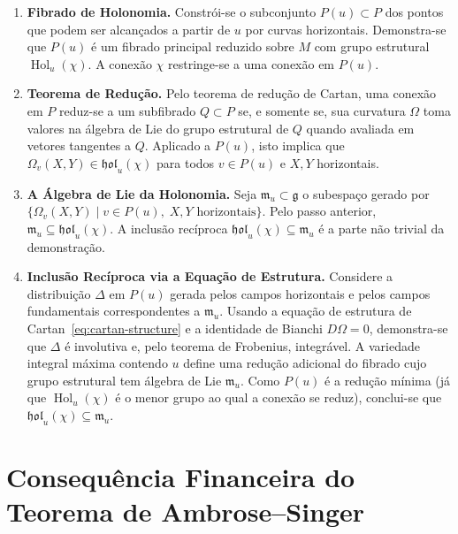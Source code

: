 \begin{enumerate}
 \item \textbf{Fibrado de Holonomia.} Constr\'oi-se o subconjunto \(P(u) \subset P\) dos pontos que podem ser alcan\c{c}ados a partir de \(u\) por curvas horizontais. Demonstra-se que \(P(u)\) \'e um fibrado principal reduzido sobre \(M\) com grupo estrutural \(\operatorname{Hol}_u(\chi)\). A conex\~ao \(\chi\) restringe-se a uma conex\~ao em \(P(u)\).

 \item \textbf{Teorema de Redu\c{c}\~ao.} Pelo teorema de redu\c{c}\~ao de Cartan, uma conex\~ao em \(P\) reduz-se a um subfibrado \(Q \subset P\) se, e somente se, sua curvatura \(\Omega\) toma valores na \'algebra de Lie do grupo estrutural de \(Q\) quando avaliada em vetores tangentes a \(Q\). Aplicado a \(P(u)\), isto implica que \(\Omega_v(X,Y) \in \mathfrak{hol}_u(\chi)\) para todos \(v \in P(u)\) e \(X,Y\) horizontais.

 \item \textbf{A \'Algebra de Lie da Holonomia.} Seja \(\mathfrak{m}_u \subset \mathfrak{g}\) o subespa\c{c}o gerado por \(\{\Omega_v(X,Y) \mid v \in P(u),\; X,Y \text{ horizontais}\}\). Pelo passo anterior, \(\mathfrak{m}_u \subseteq \mathfrak{hol}_u(\chi)\). A inclus\~ao rec\'iproca \(\mathfrak{hol}_u(\chi) \subseteq \mathfrak{m}_u\) \'e a parte n\~ao trivial da demonstra\c{c}\~ao.

 \item \textbf{Inclus\~ao Rec\'iproca via a Equa\c{c}\~ao de Estrutura.} Considere a distribui\c{c}\~ao \(\Delta\) em \(P(u)\) gerada pelos campos horizontais e pelos campos fundamentais correspondentes a \(\mathfrak{m}_u\). Usando a equa\c{c}\~ao de estrutura de Cartan~\eqref{eq:cartan-structure} e a identidade de Bianchi \(D\Omega = 0\), demonstra-se que \(\Delta\) \'e involutiva e, pelo teorema de Frobenius, integr\'avel. A variedade integral m\'axima contendo \(u\) define uma redu\c{c}\~ao adicional do fibrado cujo grupo estrutural tem \'algebra de Lie \(\mathfrak{m}_u\). Como \(P(u)\) \'e a redu\c{c}\~ao m\'inima (j\'a que \(\operatorname{Hol}_u(\chi)\) \'e o menor grupo ao qual a conex\~ao se reduz), conclui-se que \(\mathfrak{hol}_u(\chi) \subseteq \mathfrak{m}_u\).
\end{enumerate}

\section{Consequ\^encia Financeira do Teorema de Ambrose--Singer}


